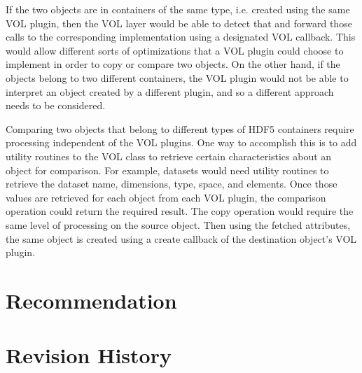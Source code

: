 \documentclass[letterpaper,hyper]{THG_RFC}
\begin{document}
If the two objects are in containers of the same type, i.e. created using the same VOL plugin, then the VOL layer would be able to detect that and forward those calls to the corresponding implementation using a designated VOL callback. This would allow different sorts of optimizations that a VOL plugin could choose to implement in order to copy or compare two objects. On the other hand, if the objects belong to two different containers, the VOL plugin would not be able to interpret an object created by a different plugin, and so a different approach needs to be considered.

Comparing two objects that belong to different types of HDF5 containers require processing independent of the VOL plugins. One way to accomplish this is to add utility routines to the VOL class to retrieve certain characteristics about an object for comparison. For example, datasets would need utility routines to retrieve the dataset name, dimensions, type, space, and elements. Once those values are retrieved for each object from each VOL plugin, the comparison operation could return the required result. The copy operation would require the same level of processing on the source object. Then using the fetched attributes, the same object is created using a create callback of the destination object's VOL plugin.

\section{Recommendation}

\section*{Revision History}
\makerevisions



\end{document}
